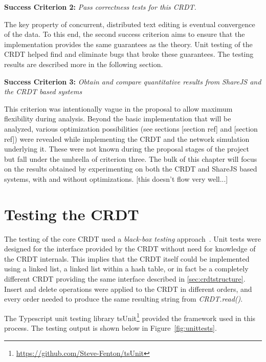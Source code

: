 \documentclass[12pt,a4paper,twoside,openright]{report}
\begin{document}
	\textbf{Success Criterion 2:} \textit{Pass correctness tests for this CRDT.}
	
	The key property of concurrent, distributed text editing is eventual convergence of the data. To this end, the second success criterion aims to ensure that the implementation provides the same guarantees as the theory. Unit testing of the CRDT helped find and eliminate bugs that broke these guarantees. The testing results are described more in the following section.
	

	\textbf{Success Criterion 3:} \textit{Obtain and compare quantitative results from ShareJS and the CRDT based systems}
	
	This criterion was intentionally vague in the proposal to allow maximum flexibility during analysis. Beyond the basic implementation that will be analyzed, various optimization possibilities (see sections [section ref] and [section ref]) were revealed while implementing the CRDT and the network simulation underlying it. These were not known during the proposal stages of the project but fall under the umbrella of criterion three. The bulk of this chapter will focus on the results obtained by experimenting on both the CRDT and ShareJS based systems, with and without optimizations.
	[this doesn't flow very well...]
	
	
	
	\section{Testing the CRDT}
	
	The testing of the core CRDT used a \textit{black-box testing} approach~\cite{Patton}. Unit tests were designed for the interface provided by the CRDT without need for knowledge of the CRDT internals. This implies that the CRDT itself could be implemented using a linked list, a linked list within a hash table, or in fact be a completely different CRDT providing the same interface described in \cref{sec:crdtstructure}. Insert and delete operations were applied to the CRDT in different orders, and every order needed to produce the same resulting string from \textit{CRDT.read()}.
	
	The Typescript unit testing library tsUnit\footnote{\url{https://github.com/Steve-Fenton/tsUnit}} provided the framework used in this process. The testing output is shown below in Figure~\ref{fig:unittests}.
\end{document}
